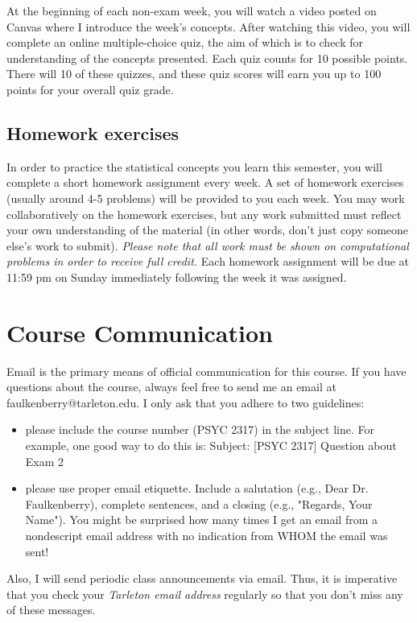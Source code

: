 \documentclass[10pt]{article}
\begin{document}
At the beginning of each non-exam week, you will watch a video posted on Canvas where I introduce the week's concepts. After watching this video, you will complete an online multiple-choice quiz, the aim of which is to check for understanding of the concepts presented. Each quiz counts for 10 possible points. There will 10 of these quizzes, and these quiz scores will earn you up to 100 points for your overall quiz grade.

\subsection*{Homework exercises}
\label{sec:org8e6101f}
In order to practice the statistical concepts you learn this semester, you will complete a short homework assignment every week. A set of homework exercises (usually around 4-5 problems) will be provided to you each week. You may work collaboratively on the homework exercises, but any work submitted must reflect your own understanding of the material (in other words, don't just copy someone else's work to submit). \emph{Please note that all work must be shown on computational problems in order to receive full credit.} Each homework assignment will be due at 11:59 pm on Sunday immediately following the week it was assigned.

\section*{Course Communication}
\label{sec:org1b70991}

Email is the primary means of official communication for this course.  If you have questions about the course, always feel free to send me an email at faulkenberry@tarleton.edu.  I only ask that you adhere to two guidelines:
\begin{itemize}
\item please include the course number (PSYC 2317) in the subject line.  For example, one good way to do this is:  Subject: [PSYC 2317] Question about Exam 2
\item please use proper email etiquette.  Include a salutation (e.g., Dear Dr. Faulkenberry), complete sentences, and a closing (e.g., "Regards, Your Name").  You might be surprised how many times I get an email from a nondescript email address with no indication from WHOM the email was sent!
\end{itemize}

Also, I will send periodic class announcements via email.  Thus, it is imperative that you check your \emph{Tarleton email address} regularly so that you don't miss any of these messages.
\end{document}

